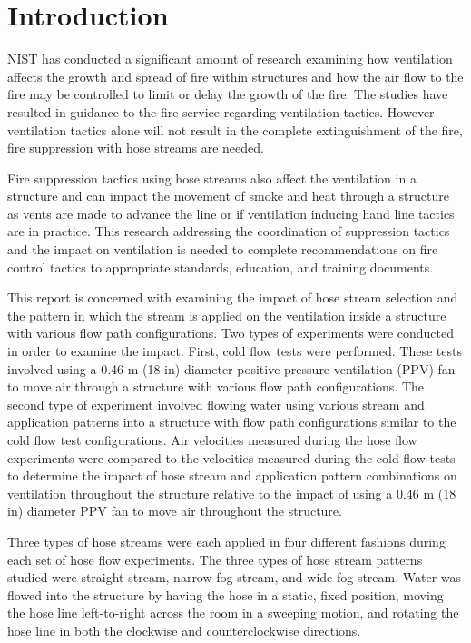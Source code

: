 \documentclass[12pt,oneside]{book}
\begin{document}
\mainmatter

\chapter{Introduction}
\label{chap:Introduction}
NIST has conducted a significant amount of research examining how ventilation affects the growth and spread of fire within structures and how the air flow to the fire may be controlled to limit or delay the growth of the fire. The studies have resulted in guidance to the fire service regarding ventilation tactics. However ventilation tactics alone will not result in the complete extinguishment of the fire, fire suppression with hose streams are needed.

Fire suppression tactics using hose streams also affect the ventilation in a structure and can impact the movement of smoke and heat through a structure as vents are made to advance the line or if ventilation inducing hand line tactics are in practice. This research addressing the coordination of suppression tactics and the impact on ventilation is needed to complete recommendations on fire control tactics to appropriate standards, education, and training documents.

This report is concerned with examining the impact of hose stream selection and the pattern in which the stream is applied on the ventilation inside a structure with various flow path configurations. Two types of experiments were conducted in order to examine the impact. First, cold flow tests were performed. These tests involved using a 0.46 m (18 in) diameter positive pressure ventilation (PPV) fan to move air through a structure with various flow path configurations. The second type of experiment involved flowing water using various stream and application patterns into a structure with flow path configurations similar to the cold flow test configurations. Air velocities measured during the hose flow experiments were compared to the velocities measured during the cold flow tests to determine the impact of hose stream and application pattern combinations on ventilation throughout the structure relative to the impact of using a 0.46 m (18 in) diameter PPV fan to move air throughout the structure. 

Three types of hose streams were each applied in four different fashions during each set of hose flow experiments. The three types of hose stream patterns studied were straight stream, narrow fog stream, and wide fog stream. Water was flowed into the structure by having the hose in a static, fixed position, moving the hose line left-to-right across the room in a sweeping motion, and rotating the hose line in both the clockwise and counterclockwise directions.
\end{document}
